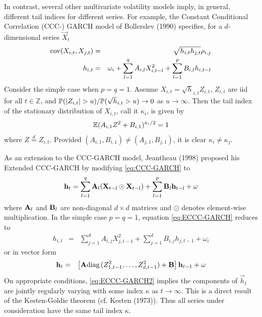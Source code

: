 \documentclass{article}
\begin{document}
In contrast, several other multivariate volatility models imply, in
general, different tail indices for different series. For example, the
Constant Conditional Correlation (CCC-) GARCH model of Bollerslev
(1990) \cite{bollerslev1990modelling} specifies, for a $d$-dimensional
series $\vec X_t$
\begin{eqnarray}
  \cov(X_{i,t}, X_{j,t}) &=& \sqrt{h_{i,t} h_{j,t}} \rho_{i,j}
  \nonumber \\
  h_{i,t} &=& \omega_i + \sum_{l=1}^q A_{i,l} X_{i, t-l}^2 +
  \sum_{l=1}^p B_{i,l} h_{i, t-l} \label{eq:CCC-GARCH}
\end{eqnarray}
Consider the simple case when $p=q=1$. Assume
$X_{i, t} = \sqrt h_{i,t} Z_{i,t}$, $Z_{i, t}$ are iid for
all $t \in \mathbb Z$, and $\P(|Z_{i,t}| > u)/\P(\sqrt h_{i,t} > u) \to 0$ as
$u \to \infty$. Then the tail index of the stationary distribution of
$X_{i,t}$, call it $\kappa_i$, is given by
\[
\E (A_{i, 1} Z^2 + B_{i, 1})^{\kappa_i / 2} = 1
\]
where $Z \overset{d}{=} Z_{i,t}$.
Provided $(A_{i,1}, B_{i,1}) \neq (A_{j,1}, B_{j,1})$, it is clear
$\kappa_i \neq \kappa_j$.

As an extension to the CCC-GARCH model, Jeantheau (1998)
\cite{jeantheau1998strong} proposed his Extended CCC-GARCH by
modifying \eqref{eq:CCC-GARCH} to
\begin{equation}
  \label{eq:ECCC-GARCH}
  \vec h_t =
  \sum_{l=1}^q \mtx A_{l} (\vec X_{t-l} \odot \vec X_{t-l})
  +
  \sum_{l=1}^p \mtx B_{l} \vec h_{t-l}
  +
  \vec \omega
\end{equation}
where $\mtx A_l$ and $\mtx B_l$ are non-diagonal $d \times d$ matrices
and $\odot$ denotes element-wise multiplication. In the simple case $p=q=1$,
equation \eqref{eq:ECCC-GARCH} reduces to
\begin{eqnarray*}
  h_{i,t} &=&
  \sum_{j=1}^d A_{i,j} X_{j, t-1}^2
  + \sum_{j=1}^d B_{i,j} h_{j, t-1}
  + \omega_i
\end{eqnarray*}
or in vector form
\begin{eqnarray}
  \vec h_t &=& \left[
    \mtx A \diag(Z_{1, t-1}^2, \dots, Z_{d, t-1}^2) + \mtx B
    \right] \vec h_{t-1} + \vec \omega
  \label{eq:ECCC-GARCH2}
\end{eqnarray}
On appropriate conditions, \eqref{eq:ECCC-GARCH2} implies the
components of $\vec h_t$ are jointly regularly varying with some index
$\kappa$ as $t \to \infty$. This is a direct result of the Kesten-Goldie
theorem (cf. Kesten (1973)\cite{Kesten1973}). Thus all series under
consideration have the same tail index $\kappa$.
\end{document}
